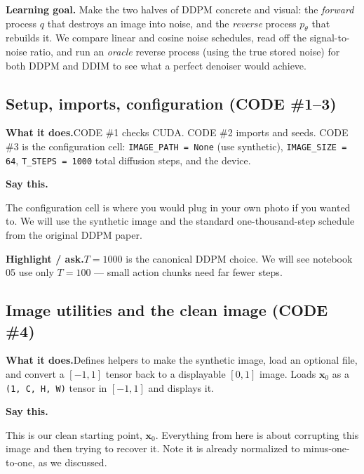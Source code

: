 \documentclass[11pt]{article}
\newenvironment{saythis}{%
  \par\smallskip\noindent
  \begin{list}{}{%
    \setlength{\leftmargin}{1.2em}%
    \setlength{\rightmargin}{0.5em}%
    \setlength{\topsep}{2pt}%
  }\item\relax
  \color{sayrule}\textbf{Say this.}\hspace{0.4em}\color{black}\itshape
}{%
  \end{list}\par\smallskip
}
\newcommand{\highlight}[1]{\par\smallskip\noindent\textcolor{hlcolor}{\textbf{Highlight / ask.}}\hspace{0.4em}#1\par\smallskip}
\newcommand{\whatdoes}[1]{\par\noindent\textbf{What it does.}\hspace{0.4em}#1\par}
\begin{document}
\textbf{Learning goal.} Make the two halves of DDPM concrete and visual: the \emph{forward} process
$q$ that destroys an image into noise, and the \emph{reverse} process $p_\theta$ that rebuilds it.
We compare linear and cosine noise schedules, read off the signal-to-noise ratio, and run an
\emph{oracle} reverse process (using the true stored noise) for both DDPM and DDIM to see what a
perfect denoiser would achieve.

\subsection{Setup, imports, configuration (CODE \#1--3)}
\whatdoes{CODE \#1 checks CUDA. CODE \#2 imports and seeds. CODE \#3 is the configuration cell:
\texttt{IMAGE\_PATH = None} (use synthetic), \texttt{IMAGE\_SIZE = 64}, \texttt{T\_STEPS = 1000} total
diffusion steps, and the device.}
\begin{saythis}
The configuration cell is where you would plug in your own photo if you wanted to. We will use the
synthetic image and the standard one-thousand-step schedule from the original DDPM paper.
\end{saythis}
\highlight{$T = 1000$ is the canonical DDPM choice. We will see notebook 05 use only $T = 100$ ---
small action chunks need far fewer steps.}

\subsection{Image utilities and the clean image (CODE \#4)}
\whatdoes{Defines helpers to make the synthetic image, load an optional file, and convert a $[-1,1]$
tensor back to a displayable $[0,1]$ image. Loads $\mathbf{x}_0$ as a \texttt{(1, C, H, W)} tensor in
$[-1,1]$ and displays it.}
\begin{saythis}
This is our clean starting point, $\mathbf{x}_0$. Everything from here is about corrupting this image
and then trying to recover it. Note it is already normalized to minus-one-to-one, as we discussed.
\end{saythis}
\end{document}

